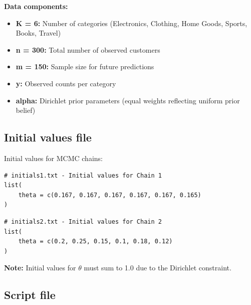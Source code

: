 \textbf{Data components:}
\begin{itemize}
\item \textbf{K = 6:} Number of categories (Electronics, Clothing, Home Goods, Sports, Books, Travel)
\item \textbf{n = 300:} Total number of observed customers
\item \textbf{m = 150:} Sample size for future predictions
\item \textbf{y:} Observed counts per category
\item \textbf{alpha:} Dirichlet prior parameters (equal weights reflecting uniform prior belief)
\end{itemize}

\subsection{Initial values file}

Initial values for MCMC chains:
\begin{codebox}
\begin{verbatim}
# initials1.txt - Initial values for Chain 1
list(
    theta = c(0.167, 0.167, 0.167, 0.167, 0.167, 0.165)
)
\end{verbatim}
\end{codebox}
\begin{codebox}
\begin{verbatim}
# initials2.txt - Initial values for Chain 2
list(
    theta = c(0.2, 0.25, 0.15, 0.1, 0.18, 0.12)
)
\end{verbatim}
\end{codebox}
\textbf{Note:} Initial values for $\theta$ must sum to 1.0 due to the Dirichlet constraint.

\subsection{Script file}

